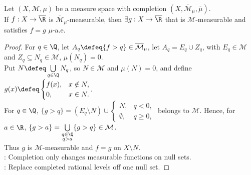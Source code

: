 \begin{proposition} \label{prop:completed-measurable-function-has-original-representative} \\
Let $(X,\mathcal{M},\mu)$ be a measure space with completion $(X,\overline{\mathcal{M}}_\mu,\overline{\mu})$.\\
If $f:X\to\overline{\R}$ is $\overline{\mathcal{M}}_\mu$-measurable, then $\exists g:X\to\overline{\R}$ that is $\mathcal{M}$-measurable and satisfies $f=g$ $\mu$-a.e.
\begin{proof}
For $q\in\Q$, let $A_q\defeq\{f>q\}\in\overline{\mathcal{M}}_\mu$, let $A_q=E_q\cup Z_q$, with $E_q\in\mathcal{M}$ and $Z_q\subseteq N_q\in\mathcal{M}$, $\mu(N_q)=0$.\\
Put $N\defeq\bigcup\limits_{q\in\Q}N_q$, so $N\in\mathcal{M}$ and $\mu(N)=0$, and define $g(x)\defeq
\begin{cases}
f(x),&x\notin N,\\
0,&x\in N.
\end{cases}$.\\
For $q\in\Q$, $\{g>q\}=(E_q\setminus N)\cup
\begin{cases}
N,&q<0,\\
\emptyset,&q\geq0,
\end{cases}$ belongs to $\mathcal{M}$. Hence, for $a\in\R$, $\{g>a\}=\bigcup\limits_{\substack{q\in\Q\\q>a}}\{g>q\}\in\mathcal{M}$.\\
Thus $g$ is $\mathcal{M}$-measurable and $f=g$ on $X\setminus N$.\\
: Completion only changes measurable functions on null sets.\\
: Replace completed rational levels off one null set.
\end{proof}
\end{proposition}

